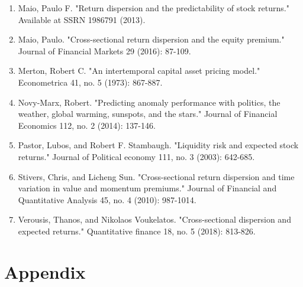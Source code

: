 \documentclass[12pt]{article}
\begin{document}
\begin{enumerate}
    \item{Maio, Paulo F. "Return dispersion and the predictability of stock returns." Available at SSRN 1986791 (2013).}
    \item{Maio, Paulo. "Cross-sectional return dispersion and the equity premium." Journal of Financial Markets 29 (2016): 87-109.}
    \item{Merton, Robert C. "An intertemporal capital asset pricing model." Econometrica 41, no. 5 (1973): 867-887.}
    \item{Novy-Marx, Robert. "Predicting anomaly performance with politics, the weather, global warming, sunspots, and the stars." Journal of Financial Economics 112, no. 2 (2014): 137-146.}
    \item{Pastor, Lubos, and Robert F. Stambaugh. "Liquidity risk and expected stock returns." Journal of Political economy 111, no. 3 (2003): 642-685.}
    \item{Stivers, Chris, and Licheng Sun. "Cross-sectional return dispersion and time variation in value and momentum premiums." Journal of Financial and Quantitative Analysis 45, no. 4 (2010): 987-1014.}
    \item{Verousis, Thanos, and Nikolaos Voukelatos. "Cross-sectional dispersion and expected returns." Quantitative finance 18, no. 5 (2018): 813-826.}

\end{enumerate}

\newpage


\section*{Appendix}
\end{document}

